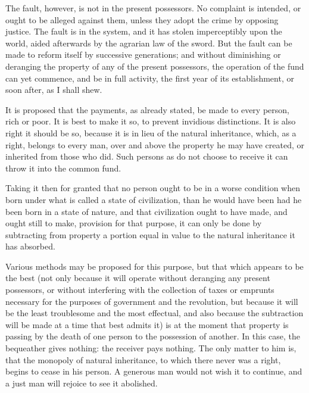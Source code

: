 The fault, however, is not in the present possessors. No complaint is intended, or ought to be alleged against them, unless they adopt the crime by opposing justice. The fault is in the system, and it has stolen imperceptibly upon the world, aided afterwards by the agrarian law of the sword. But the fault can be made to reform itself by successive generations; and without diminishing or deranging the property of any of the present possessors, the operation of the fund can yet commence, and be in full activity, the first year of its establishment, or soon after, as I shall shew.\par

It is proposed that the payments, as already stated, be made to every person, rich or poor. It is best to make it so, to prevent invidious distinctions. It is also right it should be so, because it is in lieu of the natural inheritance, which, as a right, belongs to every man, over and above the property he may have created, or inherited from those who did. Such persons as do not choose to receive it can throw it into the common fund.\par

Taking it then for granted that no person ought to be in a worse condition when born under what is called a state of civilization, than he would have been had he been born in a state of nature, and that civilization ought to have made, and ought still to make, provision for that purpose, it can only be done by subtracting from property a portion equal in value to the natural inheritance it has absorbed.\par

Various methods may be proposed for this purpose, but that which appears to be the best (not only because it will operate without deranging any present possessors, or without interfering with the collection of taxes or emprunts necessary for the purposes of government and the revolution, but because it will be the least troublesome and the most effectual, and also because the subtraction will be made at a time that best admits it) is at the moment that property is passing by the death of one person to the possession of another. In this case, the bequeather gives nothing: the receiver pays nothing. The only matter to him is, that the monopoly of natural inheritance, to which there never was a right, begins to cease in his person. A generous man would not wish it to continue, and a just man will rejoice to see it abolished.\par

